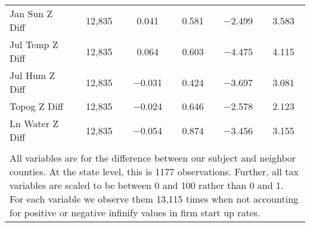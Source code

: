 \begin{table}[!htbp]
\begin{tabular}{@{\extracolsep{5pt}}lccccc}
Jan Sun Z Diff & 12,835 & 0.041 & 0.581 & $-$2.499 & 3.583 \\ 
Jul Temp Z Diff & 12,835 & 0.064 & 0.603 & $-$4.475 & 4.115 \\ 
Jul Hum Z Diff & 12,835 & $-$0.031 & 0.424 & $-$3.697 & 3.081 \\ 
Topog Z Diff & 12,835 & $-$0.024 & 0.646 & $-$2.578 & 2.123 \\ 
Ln Water Z Diff & 12,835 & $-$0.054 & 0.874 & $-$3.456 & 3.155 \\ 
\hline \\[-1.8ex] 
\multicolumn{6}{l}{All variables are for the difference between our subject and neighbor counties. At the state level, this is 1177 observations. Further, all tax variables are scaled to be between 0 and 100 rather than 0 and 1. For each variable we observe them 13,115 times when not accounting for positive or negative infinify values in firm start up rates.} \\ 
\end{tabular} 
\end{table} 
